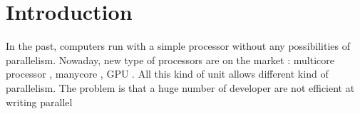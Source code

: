 \chapter*{Introduction}\label{ch:Intro}

In the past, computers run with a simple processor without any possibilities of parallelism. Nowaday, new type of processors are on the market : multicore processor , manycore , GPU . All this kind of unit allows different kind of parallelism. The problem is that a huge number of developer are not efficient at writing parallel



